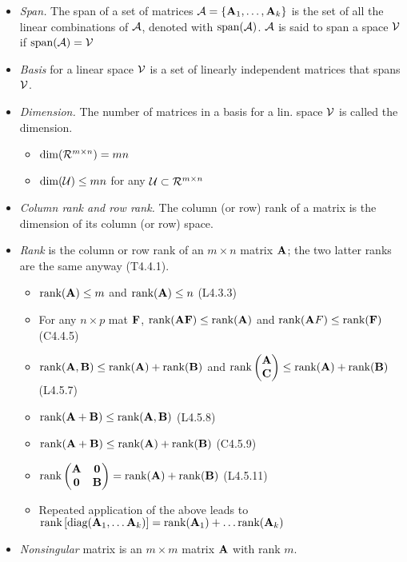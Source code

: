 \documentclass[a4paper, oneside]{book}
\begin{document}
\begin{itemize}
\item \textit{Span.} The span of a set of matrices $\mathcal A = \{\mathbf A_1, \hdots, \mathbf A_k\}$ is the set of all the linear combinations of $\mathcal A$, denoted with $\text{span}(\mathcal A)$. $\mathcal A$ is said to span a space $\mathcal V$ if $\text{span}(\mathcal A) = \mathcal V$
\item \textit{Basis} for a linear space $\mathcal V$ is a set of linearly independent matrices that spans $\mathcal V$.
\item \textit{Dimension.} The number of matrices in a basis for a lin. space $\mathcal V$ is called the dimension. 
	\begin{itemize}
	\item $\dim (\mathcal R^{m\times n}) = mn$
	\item $\dim (\mathcal U) \le mn$ for any $\mathcal U \subset \mathcal R^{m\times n}$
	\end{itemize}
\item \textit{Column rank and row rank.} The column (or row) rank of a matrix is the dimension of its column (or row) space.
\item \textit{Rank} is the column or row rank of an $m\times n$ matrix $\mathbf A$; the two latter ranks are the same anyway (T4.4.1). 
	\begin{itemize}
	\item $\text{rank} (\mathbf A)\le m$ and $\text{rank}(\mathbf A)\le n$ (L4.3.3)
	\item For any $n\times p$ mat $\mathbf F$, $\text{rank}(\mathbf{AF}) \le \text{rank} (\mathbf A)$ and  $\text{rank}(\mathbf AF) \le \text{rank} (\mathbf F)$ (C4.4.5)
	\item $\text{rank}(\mathbf{A,B}) \le \text{rank}(\mathbf A) + \text{rank}(\mathbf B)$  and $\text{rank}\left(\begin{matrix} \mathbf A \\ \mathbf C \end{matrix} \right) \le \text{rank}(\mathbf A) + \text{rank}(\mathbf B)$ (L4.5.7)
	\item $\text{rank}(\mathbf A +\mathbf B) \le \text{rank}(\mathbf{A,B})$  (L4.5.8)
	\item $\text{rank}(\mathbf A +\mathbf B) \le \text{rank}(\mathbf A) + \text{rank}(\mathbf B)$  (C4.5.9)
	\item $\text{rank}\left( \begin{matrix}
	\mathbf A & \mathbf 0 \\ \mathbf 0 & \mathbf B
	\end{matrix}\right) = \text{rank}(\mathbf A) + \text{rank}(\mathbf B)$ (L4.5.11)
	\item Repeated application of the above leads to $\text{rank}\left[\text{diag}(\mathbf{A}_1, \hdots \mathbf A_k)\right] = \text{rank}(\mathbf A_1) + \hdots \text{rank}(\mathbf A_k)$
	\end{itemize}
\item \textit{Nonsingular} matrix is an $m \times m$ matrix $\mathbf A$ with rank $m$.
\end{itemize}
\end{document}
